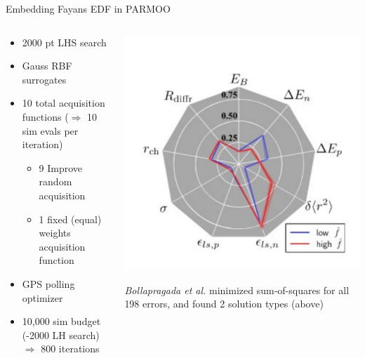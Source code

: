 \documentclass[aspectratio=169]{beamer}
\begin{document}
\begin{frame}{Embedding Fayans EDF in PARMOO}
\begin{columns}
\begin{column}{0.7\textwidth}
\begin{itemize}
\item 2000 pt LHS search
\item Gauss RBF surrogates
\item 10 total acquisition functions ($\Rightarrow$ 10 sim evals per iteration)
\begin{itemize}
\item 9 Improve random acquisition
\item 1 fixed (equal) weights acquisition function
\end{itemize}
\item GPS polling optimizer
\item 10,000 sim budget (-2000 LH search) $\Rightarrow$ 800 iterations
\end{itemize}
\end{column}
\begin{column}{0.29\textwidth}
\includegraphics[width=\textwidth]{solns.pdf}\\
\vskip -30pt
\begin{center}
{\it Bollapragada et al.}
minimized sum-of-squares for all 198 errors, and found 2 solution types (above)
\end{center}
\end{column}
\end{columns}
\end{frame}
\end{document}
